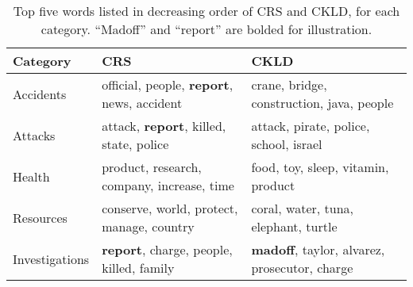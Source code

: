 
\begin{table}[h]
    \small
\centering
\begin{center}
\begin{tabular}{l||l|l}
    \textbf{Category} & \textbf{CRS}    & \textbf{CKLD}  \\ \hline
Accidents   & official,    people,  {\bf report},  news,    accident    & crane, bridge,  construction,    java,    people \\
Attacks     & attack,  {\bf report},  killed,  state,   police  & attack,    pirate,  police,  school,  israel \\
Health      & product,   research,    company, increase,    time & food, toy, sleep,   vitamin, product \\
Resources   & conserve,  world,   protect, manage,  country & coral, water,   tuna,    elephant,    turtle \\
Investigations& {\bf report},  charge,  people,  killed,  family & {\bf madoff}, taylor,  alvarez, prosecutor,  charge \\
\end{tabular}
\end{center}
\normalsize
\caption{Top five words listed in decreasing order of CRS and CKLD, for each category.
 ``Madoff'' and ``report'' are bolded for illustration.}
\label{table:crs_ckld_list}
\end{table}

